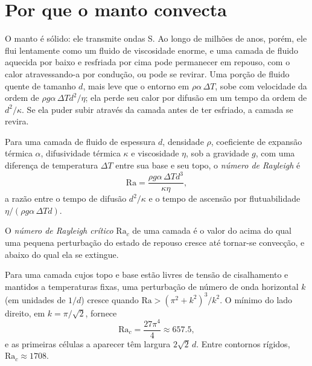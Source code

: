 \section{Por que o manto convecta}

O manto é sólido: ele transmite ondas S. Ao longo de milhões de anos, porém,
ele flui lentamente como um fluido de viscosidade enorme, e uma camada de
fluido aquecida por baixo e resfriada por cima pode permanecer em repouso, com
o calor atravessando-a por condução, ou pode se revirar. Uma porção de fluido
quente de tamanho $d$, mais leve que o entorno em $\rho\alpha\,\Delta T$, sobe
com velocidade da ordem de $\rho g\alpha\,\Delta T d^2/\eta$; ela perde seu calor
por difusão em um tempo da ordem de $d^2/\kappa$. Se ela puder subir através da
camada antes de ter esfriado, a camada se revira.

\begin{definition}\label{def:b3:mantle-convection:rayleigh}
Para uma camada de fluido de espessura $d$, densidade $\rho$, coeficiente de
expansão térmica $\alpha$, difusividade térmica $\kappa$ e viscosidade $\eta$,
sob a gravidade $g$, com uma diferença de temperatura $\Delta T$ entre sua base
e seu topo, o \emph{número de Rayleigh} é
\[
  \mathrm{Ra} = \frac{\rho g\alpha\,\Delta T d^3}{\kappa\eta},
\]
a razão entre o tempo de difusão $d^2/\kappa$ e o tempo de ascensão por
flutuabilidade $\eta/(\rho g\alpha\,\Delta Td)$.
\end{definition}

\begin{definition}\label{def:b3:mantle-convection:critical}
O \emph{número de Rayleigh crítico}
$\mathrm{Ra}_c$ de uma camada é o valor do  acima do qual uma
pequena perturbação do estado de repouso cresce até tornar-se convecção, e abaixo
do qual ela se extingue.
\end{definition}

\begin{proposition}\label{prop:b3:mantle-convection:onset}
Para uma camada cujos topo e base estão livres de tensão de cisalhamento e
mantidos a temperaturas fixas, uma perturbação de número de onda horizontal $k$
(em unidades de $1/d$) cresce quando $\mathrm{Ra} > (\pi^2 + k^2)^3/k^2$. O mínimo do
lado direito, em $k = \pi/\sqrt2$, fornece
\[
  \mathrm{Ra}_c = \frac{27\pi^4}{4} \approx 657.5,
\]
e as primeiras células a aparecer têm largura $2\sqrt2\,d$. Entre contornos rígidos,
$\mathrm{Ra}_c \approx 1708$.
\end{proposition}

